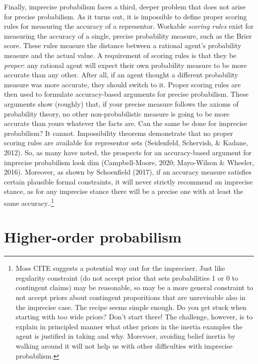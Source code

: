 \documentclass[
  letterpaper,
  DIV=11,
  numbers=noendperiod]{scrartcl}
\begin{document}
Finally, imprecise probabilism faces a third, deeper problem that does
not arise for precise probabilism. As it turns out, it is impossible to
define proper scoring rules for measuring the accuracy of a representor.
Workable \emph{scoring rules} exist for measuring the accuracy of a
single, precise probability measure, such as the Brier score. These
rules measure the distance between a rational agent's probability
measure and the actual value. A requirement of scoring rules is that
they be \emph{proper}: any rational agent will expect their own
probability measure to be more accurate than any other. After all, if an
agent thought a different probability measure was more accurate, they
should switch to it. Proper scoring rules are then used to formulate
accuracy-based arguments for precise probabilism. These arguments show
(roughly) that, if your precise measure follows the axioms of
probability theory, no other non-probabilistic measure is going to be
more accurate than yours whatever the facts are. Can the same be done
for imprecise probabilism? It cannot. Impossibility theorems demonstrate
that no proper scoring rules are available for representor sets
(Seidenfeld, Schervish, \& Kadane, 2012). So, as many have noted, the
prospects for an accuracy-based argument for imprecise probabilism look
dim (Campbell-Moore, 2020; Mayo-Wilson \& Wheeler, 2016). Moreover, as
shown by Schoenfield (2017), if an accuracy measure satisfies certain
plausible formal constraints, it will never strictly recommend an
imprecise stance, as for any imprecise stance there will be a precise
one with at least the same
accuracy..\footnote{Moss
  CITE suggests a potential way out for the impreciser. Just like
  regularity constraint (do not accept prior that sets probabilities 1
  or 0 to contingent claims) may be reasonable, so may be a more general
  constraint to not accept priors about contingent proporitions that are
  unrevisable also in the imprecise case. The recipe seems simple
  enough. Do you get stuck when starting with too wide priors? Don't
  start there! The challenge, however, is to explain in principled
  manner what other priors in the inertia examples the agent is
  justified in taking and why. Morevoer, avoiding belief inertia by
  walking around it will not help us with other difficulties with
  imprecise probabilism.}

\hypertarget{higher-order-probabilism}{%
\section{Higher-order probabilism}\label{higher-order-probabilism}}
\end{document}
